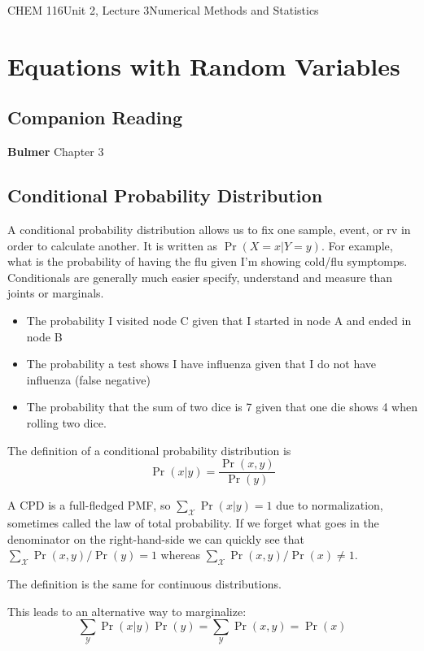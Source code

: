\documentclass{article}
\begin{document}
\begin{tdoc}{CHEM 116}{Unit 2, Lecture 3}{Numerical Methods and Statistics}

  \section{Equations with Random Variables}

  \subsection*{Companion Reading}
  \textbf{Bulmer} Chapter 3

\subsection{Conditional Probability Distribution}
A conditional probability distribution allows us to fix one sample,
event, or rv in order to calculate another. It is written as
$\Pr(X=x|Y=y)$. For example, what is the probability of having the flu
given I'm showing cold/flu symptomps. Conditionals are generally much
easier specify, understand and measure than joints or marginals.

\begin{itemize}
\item The probability I visited node C given that I started in node A and ended in node B
\item The probability a test shows I have influenza given that I do not have influenza (false negative)
\item The probability that the sum of two dice is 7 given that one die shows 4 when rolling two dice.

\end{itemize}

The definition of a conditional probability distribution is
\begin{equation}
\Pr(x|y) = \frac{\Pr(x,y)}{\Pr(y)}
\end{equation}

A CPD is a full-fledged PMF, so $\sum_\mathcal{X} \Pr(x|y) = 1$ due to
normalization, sometimes called the law of total probability.  If we
forget what goes in the denominator on the right-hand-side we can
quickly see that $\sum_\mathcal{X} \Pr(x,y) / \Pr(y) = 1$ whereas
$\sum_\mathcal{X} \Pr(x,y) / \Pr(x) \neq 1$.

The definition is the same for continuous distributions.

This leads to an alternative way to marginalize:
\[
\sum_\mathcal{Y} \Pr(x|y) \Pr(y) = \sum_\mathcal{Y} \Pr(x,y) = \Pr(x)
\]



\end{tdoc}
\end{document}
